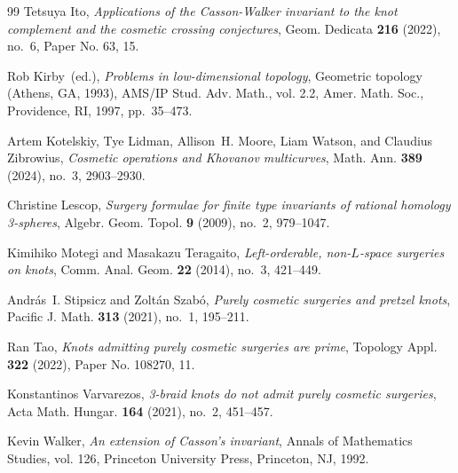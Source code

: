 \documentclass{amsart}
\theoremstyle{remark}
\begin{document}
\begin{thebibliography}{99}
Tetsuya Ito, \emph{Applications of the {C}asson-{W}alker invariant to the knot complement and the cosmetic crossing conjectures}, Geom. Dedicata \textbf{216} (2022), no.~6, Paper No. 63, 15. 

Rob Kirby~(ed.), \emph{Problems in low-dimensional topology}, Geometric topology ({A}thens, {GA}, 1993), AMS/IP Stud. Adv. Math., vol. 2.2, Amer. Math. Soc., Providence, RI, 1997, pp.~35--473. 

Artem Kotelskiy, Tye Lidman, Allison~H. Moore, Liam Watson, and Claudius Zibrowius, \emph{Cosmetic operations and {K}hovanov multicurves}, Math. Ann. \textbf{389} (2024), no.~3, 2903--2930. 

Christine Lescop, \emph{Surgery formulae for finite type invariants of rational homology 3-spheres}, Algebr. Geom. Topol. \textbf{9} (2009), no.~2, 979--1047. 

Kimihiko Motegi and Masakazu Teragaito, \emph{Left-orderable, non-{$L$}-space surgeries on knots}, Comm. Anal. Geom. \textbf{22} (2014), no.~3, 421--449. 

Andr\'{a}s~I. Stipsicz and Zolt\'{a}n Szab\'{o}, \emph{Purely cosmetic surgeries and pretzel knots}, Pacific J. Math. \textbf{313} (2021), no.~1, 195--211. 

Ran Tao, \emph{Knots admitting purely cosmetic surgeries are prime}, Topology Appl. \textbf{322} (2022), Paper No. 108270, 11. 

Konstantinos Varvarezos, \emph{3-braid knots do not admit purely cosmetic surgeries}, Acta Math. Hungar. \textbf{164} (2021), no.~2, 451--457. 

Kevin Walker, \emph{An extension of {C}asson's invariant}, Annals of Mathematics Studies, vol. 126, Princeton University Press, Princeton, NJ, 1992. 

\end{thebibliography}
\end{document}
